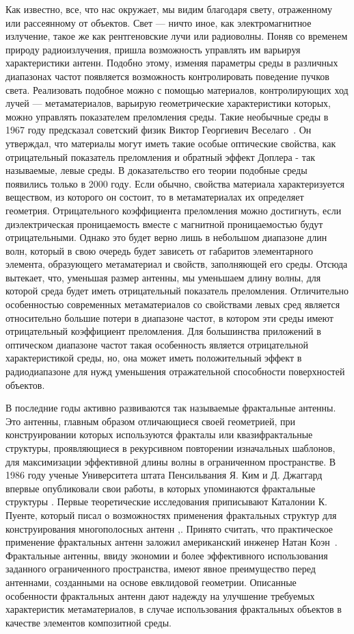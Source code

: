 Как известно, все, что нас окружает, мы видим благодаря свету, отраженному или рассеянному от объектов. Свет --- ничто иное, как электромагнитное излучение, такое же как рентгеновские лучи или радиоволны. Поняв со временем природу радиоизлучения, пришла возможность управлять им варьируя характеристики антенн. Подобно этому, изменяя параметры среды в различных диапазонах частот появляется возможность контролировать поведение пучков света. Реализовать подобное можно с помощью материалов, контролирующих ход лучей --- метаматериалов, варьирую геометрические характеристики которых, можно управлять показателем преломления среды. 
Такие необычные среды в 1967 году предсказал советский физик Виктор Георгиевич Веселаго~\cite{b11}. Он утверждал, что материалы могут иметь такие особые оптические свойства, как отрицательный показатель преломления и обратный эффект Доплера - так называемые, левые среды. В доказательство его теории подобные среды появились только в 2000 году. Если обычно, свойства материала характеризуется веществом, из которого он состоит, то в метаматериалах их определяет геометрия. Отрицательного коэффициента преломления можно достигнуть, если диэлектрическая проницаемость вместе с магнитной проницаемостью будут отрицательными. Однако это будет верно лишь в небольшом диапазоне длин волн, который в свою очередь будет зависеть от габаритов элементарного элемента, образующего метаматериал и свойств, заполняющей его среды. Отсюда вытекает, что, уменьшая размер антенны, мы уменьшаем длину волны, для которой среда будет иметь отрицательный показатель преломления. Отличительно особенностью современных метаматериалов со свойствами левых сред является относительно большие потери в диапазоне частот, в котором эти среды имеют отрицательный коэффициент преломления. Для большинства приложений в оптическом диапазоне частот такая особенность является отрицательной характеристикой среды, но, она может иметь положительный эффект в радиодиапазоне для нужд уменьшения отражательной способности поверхностей объектов.

В последние годы активно развиваются так называемые фрактальные антенны. Это антенны, главным образом отличающиеся своей геометрией, при конструировании которых используются фракталы или квазифрактальные структуры, проявляющиеся в рекурсивном повторении изначальных шаблонов, для максимизации эффективной длины волны в ограниченном пространстве. В 1986 году ученые Университета штата Пенсильвания Я. Ким и Д. Джаггард впервые опубликовали свои работы, в которых упоминаются фрактальные структуры \cite{b1}. Первые теоретические исследования приписывают Каталонии К. Пуенте, который писал о возможностях применения фрактальных структур для конструирования многополосных антенн \cite{b8},\cite{b9}. Принято считать, что практическое применение фрактальных антенн заложил американский инженер Натан Коэн~\cite{b10}. Фрактальные антенны, ввиду экономии и более эффективного использования заданного ограниченного пространства, имеют явное преимущество перед антеннами, созданными на основе евклидовой геометрии. Описанные особенности фрактальных антенн дают надежду на улучшение требуемых характеристик метаматериалов, в случае использования фрактальных объектов в качестве элементов композитной среды.

